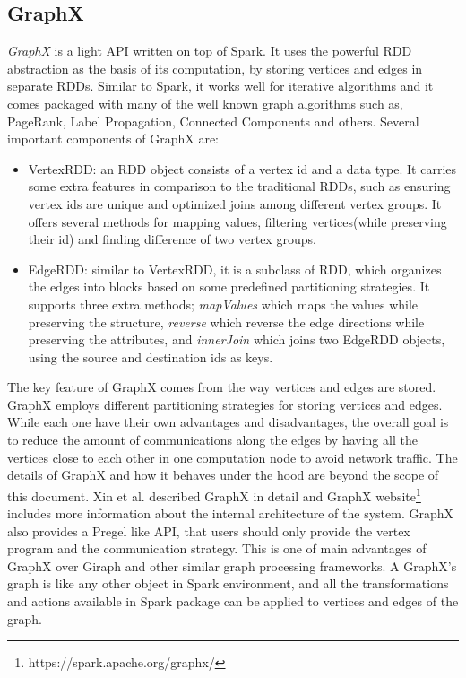 \documentclass[english]{tktltiki}
\begin{document}
\subsection{GraphX}
\textit{GraphX} is a light API written on top of Spark. 
It uses the powerful RDD abstraction as the basis of its computation, by storing vertices and edges in separate RDDs. 
Similar to Spark, it works well for iterative algorithms and it comes packaged with many of the well known graph algorithms such as, PageRank, Label Propagation, Connected Components and others. 
Several important components of GraphX are:
\begin{itemize}
\item VertexRDD: an RDD object consists of a vertex id and a data type. 
It carries some extra features in comparison to the traditional RDDs, such as ensuring vertex ids are unique and optimized joins among different vertex groups. 
It offers several methods for mapping values, filtering vertices(while preserving their id) and finding difference of two vertex groups.
\item EdgeRDD: similar to VertexRDD, it is a subclass of RDD, which organizes the edges into blocks based on some predefined partitioning strategies. 
It supports three extra methods; \textit{mapValues} which maps the values while preserving the structure, \textit{reverse} which reverse the edge directions while preserving the attributes, and \textit{innerJoin} which joins two EdgeRDD objects, using the source and destination ids as keys. 
\end{itemize}
The key feature of GraphX comes from the way vertices and edges are stored. 
GraphX employs different partitioning strategies for storing vertices and edges.
While each one have their own advantages and disadvantages, the overall goal is to reduce the amount of communications along the edges by having all the vertices close to each other in one computation node to avoid network traffic. 
The details of GraphX and how it behaves under the hood are beyond the scope of this document. 
Xin et al. \cite{xin13} described GraphX in detail and GraphX website\footnote{https://spark.apache.org/graphx/} includes more information about the internal architecture of the system.
GraphX also provides a Pregel like API, that users should only provide the vertex program and the communication strategy. 
This is one of main advantages of GraphX over Giraph and other similar graph processing frameworks. 
A GraphX's graph is like any other object in Spark environment, and all the transformations and actions available in Spark package can be applied to vertices and edges of the graph. 
\end{document}
